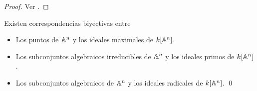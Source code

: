 \begin{proof}
Ver \cite[pp. 20-22]{fulton}.
\end{proof}

\begin{corollary}
Existen correspondencias biyectivas entre

\begin{itemize}
    \item Los puntos de $\mathbb A^n$ y los ideales maximales de $k[\mathbb A^n]$.
    \item Los subconjuntos algebraicos irreducibles de $\mathbb A^n$ y los ideales primos de $k[\mathbb A^n]$.
    \item Los subconjuntos algebraicos de $\mathbb A^n$ y los ideales radicales de $k[\mathbb A^n]$. \qed
\end{itemize}
\end{corollary}
